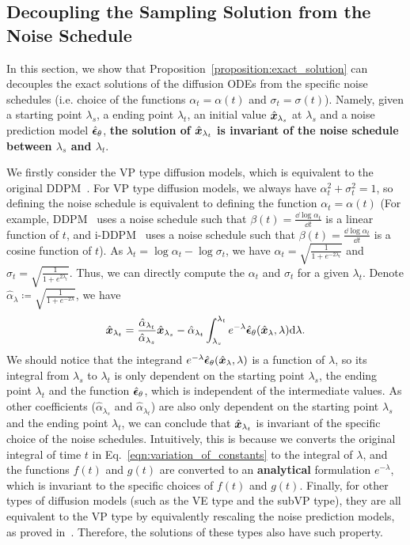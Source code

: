 \subsection{Decoupling the Sampling Solution from the Noise Schedule}
\label{sec:decoupling}
In this section, we show that Proposition~\ref{proposition:exact_solution} can decouples the exact solutions of the diffusion ODEs from the specific noise schedules (i.e. choice of the functions $\alpha_t=\alpha(t)$ and $\sigma_t=\sigma(t)$). Namely, given a starting point $\lambda_s$, a ending point $\lambda_t$, an initial value $\hat{\bm{x}}_{\lambda_s}$ at $\lambda_s$ and a noise prediction model $\hat{\bm{\epsilon}}_\theta$, \textbf{the solution of $\hat{\bm{x}}_{\lambda_t}$ is invariant of the noise schedule between $\lambda_s$ and $\lambda_t$}.

We firstly consider the VP type diffusion models, which is equivalent to the original DDPM~\citep{ho2020denoising,song2020score}. For VP type diffusion models, we always have $\alpha_t^2+\sigma_t^2=1$, so defining the noise schedule is equivalent to defining the function $\alpha_t=\alpha(t)$ (For example, DDPM~\citep{ho2020denoising} uses a noise schedule such that $\beta(t)=\frac{\dd\log\alpha_t}{\dd t}$ is a linear function of $t$, and i-DDPM~\citep{nichol2021improved} uses a noise schedule such that $\beta(t)=\frac{\dd\log\alpha_t}{\dd t}$ is a cosine function of $t$). As $\lambda_t=\log\alpha_t-\log\sigma_t$, we have $\alpha_t = \sqrt{\frac{1}{1+e^{-2\lambda_t}}}$ and $\sigma_t=\sqrt{\frac{1}{1+e^{2\lambda_t}}}$. Thus, we can directly compute the $\alpha_t$ and $\sigma_t$ for a given $\lambda_t$. Denote $\hat\alpha_{\lambda}\coloneqq \sqrt{\frac{1}{1+e^{-2\lambda}}}$, we have
\begin{equation}
    \hat{\bm{x}}_{\lambda_t} = \frac{\hat\alpha_{\lambda_t}}{\hat\alpha_{\lambda_s}}\hat{\bm{x}}_{\lambda_s} - \hat\alpha_{\lambda_t} \int_{\lambda_s}^{\lambda_t} e^{-\lambda} \hat{\bm{\epsilon}}_\theta(\hat{\bm{x}}_\lambda,\lambda)\dd\lambda.
\end{equation}
We should notice that the integrand $e^{-\lambda}\hat{\bm{\epsilon}}_\theta(\hat{\bm{x}}_{\lambda},\lambda)$ is a function of $\lambda$, so its integral from $\lambda_s$ to $\lambda_t$ is only dependent on the starting point $\lambda_s$, the ending point $\lambda_t$ and the function $\hat{\bm{\epsilon}}_\theta$, which is independent of the intermediate values. As other coefficients ($\hat\alpha_{\lambda_s}$ and $\hat\alpha_{\lambda_t}$) are also only dependent on the starting point $\lambda_s$ and the ending point $\lambda_t$, we can conclude that $\hat{\bm{x}}_{\lambda_t}$ is invariant of the specific choice of the noise schedules. Intuitively, this is because we converts the original integral of time $t$ in Eq.~\eqref{eqn:variation_of_constants} to the integral of $\lambda$, and the functions $f(t)$ and $g(t)$ are converted to an \textbf{analytical} formulation $e^{-\lambda}$, which is invariant to the specific choices of $f(t)$ and $g(t)$. Finally, for other types of diffusion models (such as the VE type and the subVP type), they are all equivalent to the VP type by equivalently rescaling the noise prediction models, as proved in~\citep{kingma2021variational}. Therefore, the solutions of these types also have such property.

